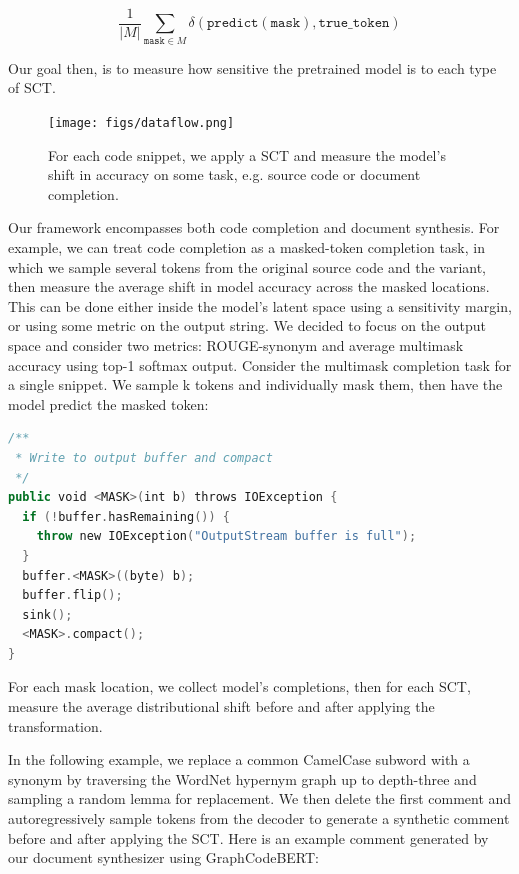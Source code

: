 \documentclass[sigconf,review,anonymous]{acmart}
\begin{document}
  \begin{equation}
    \frac{1}{|M|}\sum_{\texttt{mask} \in M} δ(\texttt{predict}(\texttt{mask}), \texttt{true_token})
  \end{equation}

  Our goal then, is to measure how sensitive the pretrained model is to each type of SCT.

  \begin{figure}[H]
    \centering
    \texttt{[image: figs/dataflow.png]}
    \caption{For each code snippet, we apply a SCT and measure the model's shift in accuracy on some task, e.g. source code or document completion.}
    \label{fig:dataflow}
  \end{figure}

  Our framework encompasses both code completion and document synthesis. For example, we can treat code completion as a masked-token completion task, in which we sample several tokens from the original source code and the variant, then measure the average shift in model accuracy across the masked locations. This can be done either inside the model's latent space using a sensitivity margin, or using some metric on the output string. We decided to focus on the output space and consider two metrics: ROUGE-synonym and average multimask accuracy using top-1 softmax output. Consider the multimask completion task for a single snippet. We sample k tokens and individually mask them, then have the model predict the masked token:

  \begin{lstlisting}[basicstyle=\scriptsize\ttfamily, language=kotlin,label={lst:example2}]
/**
 * Write to output buffer and compact
 */
public void <MASK>(int b) throws IOException {
  if (!buffer.hasRemaining()) {
    throw new IOException("OutputStream buffer is full");
  }
  buffer.<MASK>((byte) b);
  buffer.flip();
  sink();
  <MASK>.compact();
}
  \end{lstlisting}

  For each mask location, we collect model's completions, then for each SCT, measure the average distributional shift before and after applying the transformation.

  In the following example, we replace a common CamelCase subword with a synonym by traversing the WordNet hypernym graph up to depth-three and sampling a random lemma for replacement. We then delete the first comment and autoregressively sample tokens from the decoder to generate a synthetic comment before and after applying the SCT. Here is an example comment generated by our document synthesizer using GraphCodeBERT:
\end{document}
